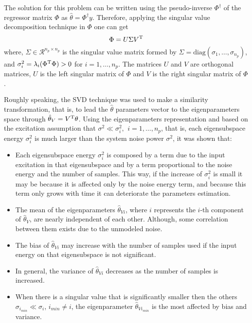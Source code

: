 The solution for this problem can be written using the pseudo-inverse $\Phi^\dagger $ of the regressor matrix $\Phi$ as
$	\hat{\theta} = \Phi^\dagger y $.
Therefore, applying the singular value decomposition technique in $\Phi$ one can get
\[
	\Phi = U \Sigma V^\text{T}
\]
where, $\Sigma \in \mathcal{R}^{n_p\times n_p}$  is the singular value matrix formed by $\Sigma = \text{diag}(\sigma_1, \dots, \sigma_{n_p})$, and $\sigma_i^2 = \lambda_i(\Phi^\text{T} \Phi) > 0$ for $i=1, \dots, n_p$.
The matrices $U$ and $V$ are orthogonal matrices, $U$ is the left singular matrix of $\Phi$ and $V$ is the right singular matrix of $\Phi$.

Roughly speaking, the SVD technique was used to make a similarity transformation, that is, to lead the $\hat{\theta}$ parameters vector to the eigenparameters space through $\hat{\theta}_V = V^\text{T} \theta$.
Using the eigenparameters representation and based on the excitation assumption that $\sigma^2 \ll \sigma_i^2, \,\ i = 1, \dots, n_p $, that is, each eigensubspace energy $\sigma_i^2$ is much larger than the system noise power $\sigma^2$, it was shown that:
\begin{itemize}
	\item Each eigensubspace energy $\sigma_i^2$ is composed by a term due to the input excitation in that eigensubspace and by a term proportional to the noise energy and the number of samples.
	This way, if the increase of $\sigma_i^2$ is small it may be because it is affected only by the noise energy term, and because this term only grows with time it can deteriorate the parameters estimation.
	\item The mean of the eigenparameters $\hat{\theta}_{Vi}$, where $i$ represents the $i$-th component of $\hat{\theta}_V$, are nearly independent of each other. Although, some correlation between them exists due to the unmodeled noise.
	\item The bias of $\hat{\theta}_{Vi}$ may increase with the number of samples used if the input energy on that eigensubspace is not significant.
	\item In general, the variance of $\hat{\theta}_{Vi}$ decreases as the number of samples is increased.
	\item When there is a singular value that is significantly smaller then the others $\sigma_{i_{min}} \ll \sigma_i$, $i_{min} \neq i$, the eigenparameter $\hat{\theta}_{Vi_{min}}$ is the most affected by bias and variance.
\end{itemize}

